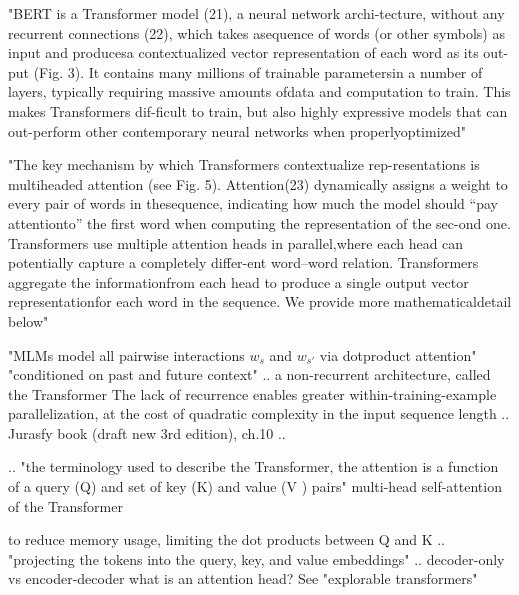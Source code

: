 "BERT is a Transformer model (21), a neural network archi-tecture,  without  any  recurrent  connections  (22),  which  takes  asequence  of  words  (or  other  symbols)  as  input  and  producesa contextualized vector representation of each word as its out-put (Fig. 3). It contains many millions of trainable parametersin  a  number  of  layers,  typically  requiring  massive  amounts  ofdata  and  computation  to  train.  This  makes  Transformers  dif-ficult  to  train,  but  also  highly  expressive  models  that  can  out-perform  other  contemporary  neural  networks  when  properlyoptimized" \citep{manning2020emergent}


"The key mechanism by which Transformers contextualize rep-resentations  is  multiheaded  attention  (see  Fig.  5).  Attention(23) dynamically assigns a weight to every pair of words in thesequence, indicating how much the model should “pay attentionto” the first word when computing the representation of the sec-ond one. Transformers use multiple attention heads in parallel,where  each  head  can  potentially  capture  a  completely  differ-ent word–word relation. Transformers aggregate the informationfrom each head to produce a single output vector representationfor each word in the sequence. We provide more mathematicaldetail below" \citep{manning2020emergent}


"MLMs model all pairwise interactions $w_s$ and $w_{s'}$ via dotproduct attention" "conditioned on past and future context" \citep{salazar2020masked}
..
a non-recurrent architecture, called the Transformer \citep{vaswani2017attention} 
The lack of recurrence enables greater within-training-example parallelization, at the cost of quadratic complexity in the input sequence length  \citep{liu2018generating} 
..
Jurasfy book (draft new 3rd edition), ch.10 ..
\citep[ch.9-10]{jurafsky2021speech} 

..
"the terminology used to describe the Transformer, the attention is a function of a query (Q) and set of key (K) and value (V ) pairs" \citep{liu2018generating} 
multi-head self-attention of the Transformer

to reduce memory usage, limiting the dot products between Q and K
..
"projecting the tokens into the query, key, and value embeddings"
..
decoder-only vs encoder-decoder
what is an attention head? See "explorable transformers" 

